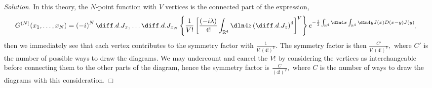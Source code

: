 \begin{proof}[Solution]
   In this theory, the \(N\)-point function with \(V\) vertices is the connected part of the expression,
   \begin{equation*}
      G^{(N)}(x_1, \dots, x_N) = \left(-i\right)^N \diff.d.{}{J_{x_1}} \dots \diff.d.{}{J_{x_N}} \left\{\frac{1}{V!} \left[\frac{(-i \lambda)}{4!}\int_{\mathbb{R}^4} \dln4z \left(\diff.d.{}{J_{z}}\right)^4\right]^V\right\}e^{-\frac12 \int_{\mathbb{R}^4} \dln4x\int_{\mathbb{R}^4} \dln4y J(x) D(x - y) J(y)},
   \end{equation*}
   then we immediately see that each vertex contributes to the symmetry factor with \(\frac{1}{V!(4!)^V}\). The symmetry factor is then \(\frac{C'}{V! (4!)^V},\) where \(C'\) is the number of possible ways to draw the diagrams. We may undercount and cancel the \(V!\) by considering the vertices as interchangeable before connecting them to the other parts of the diagram, hence the symmetry factor is \(\frac{C}{(4!)^V},\) where \(C\) is the number of ways to draw the diagrams with this consideration.


\end{proof}
